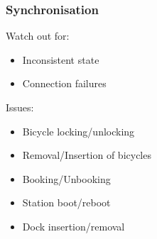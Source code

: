 \begin{frame}
	\frametitle{Synchronisation}
	Watch out for:
	\begin{itemize}
		\item Inconsistent state
		\item Connection failures
	\end{itemize}
	\pause
	Issues:
	\begin{itemize}
		\item Bicycle locking/unlocking
		\item Removal/Insertion of bicycles
		\item Booking/Unbooking
		\item Station boot/reboot
		\item Dock insertion/removal
	\end{itemize}
\end{frame}